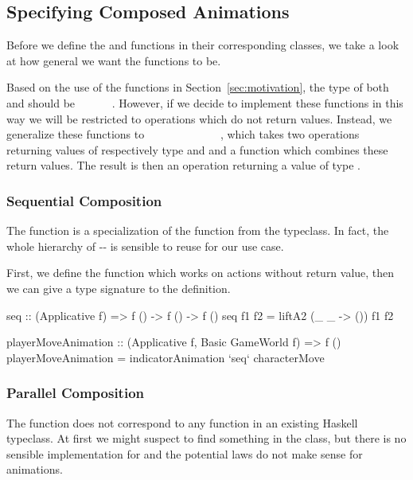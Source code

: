 \subsection{Specifying Composed Animations}

Before we define the  and  functions in their corresponding classes, we take a look at how general we want the functions to be.

Based on the use of the functions in Section~\ref{sec:motivation}, the type of both  and  should be ~\hs{()}~\hs{->}~~\hs{->}~~\hs{()}. However, if we decide to implement these functions in this way we will be restricted to operations which do not return values. Instead, we generalize these functions to \hs{(}~\hs{->}~~\hs{->}~\hs{)}~\hs{->}~~~\hs{->}~~~\hs{->}~~, which takes two operations returning values of respectively type  and  and a function which combines these return values. The result is then an operation returning a value of type .

\subsubsection{Sequential Composition}

The  function is a specialization of the  function from the  typeclass. In fact, the whole hierarchy of -- is sensible to reuse for our use case.

First, we define the  function which works on actions without return value, then we can give a type signature to the  definition.

\begin{code}
seq :: (Applicative f) => f () -> f () -> f ()
seq f1 f2 = liftA2 (\_ _ -> ()) f1 f2

playerMoveAnimation :: (Applicative f, Basic GameWorld f) => f ()
playerMoveAnimation = indicatorAnimation `seq` characterMove
\end{code}

\subsubsection{Parallel Composition}

The  function does not correspond to any function in an existing Haskell typeclass. At first we might suspect to find something in the  class, but there is no sensible implementation for  and the potential laws do not make sense for animations.

